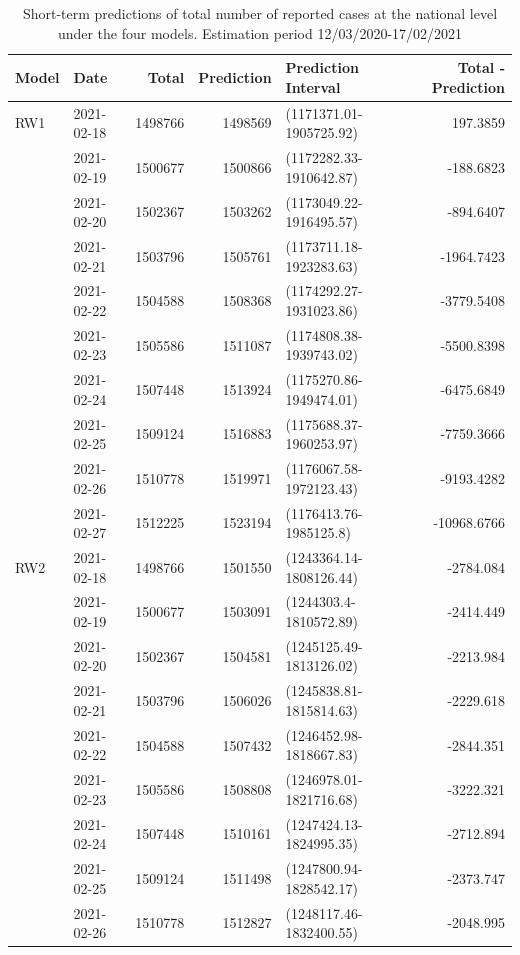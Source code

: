 \documentclass[10pt,letterpaper]{article}
\begin{document}
\begin{table}[!h]

\caption{\label{tab:10daypred}Short-term predictions of total number of reported cases at the national level under the four models. Estimation period 12/03/2020-17/02/2021}
\centering
\begin{tabular}[t]{l|l|r|r|l|r}
\hline
Model&Date & Total & Prediction & Prediction Interval & Total - Prediction\\
\hline
RW1&2021-02-18 & 1498766 & 1498569 & (1171371.01-1905725.92) & 197.3859\\
&2021-02-19 & 1500677 & 1500866 & (1172282.33-1910642.87) & -188.6823\\
&2021-02-20 & 1502367 & 1503262 & (1173049.22-1916495.57) & -894.6407\\
&2021-02-21 & 1503796 & 1505761 & (1173711.18-1923283.63) & -1964.7423\\
&2021-02-22 & 1504588 & 1508368 & (1174292.27-1931023.86) & -3779.5408\\
&2021-02-23 & 1505586 & 1511087 & (1174808.38-1939743.02) & -5500.8398\\
&2021-02-24 & 1507448 & 1513924 & (1175270.86-1949474.01) & -6475.6849\\
&2021-02-25 & 1509124 & 1516883 & (1175688.37-1960253.97) & -7759.3666\\
&2021-02-26 & 1510778 & 1519971 & (1176067.58-1972123.43) & -9193.4282\\
&2021-02-27 & 1512225 & 1523194 & (1176413.76-1985125.8) & -10968.6766\\
\hline
RW2&2021-02-18 & 1498766 & 1501550 & (1243364.14-1808126.44) & -2784.084\\
&2021-02-19 & 1500677 & 1503091 & (1244303.4-1810572.89) & -2414.449\\
&2021-02-20 & 1502367 & 1504581 & (1245125.49-1813126.02) & -2213.984\\
&2021-02-21 & 1503796 & 1506026 & (1245838.81-1815814.63) & -2229.618\\
&2021-02-22 & 1504588 & 1507432 & (1246452.98-1818667.83) & -2844.351\\
&2021-02-23 & 1505586 & 1508808 & (1246978.01-1821716.68) & -3222.321\\
&2021-02-24 & 1507448 & 1510161 & (1247424.13-1824995.35) & -2712.894\\
&2021-02-25 & 1509124 & 1511498 & (1247800.94-1828542.17) & -2373.747\\
&2021-02-26 & 1510778 & 1512827 & (1248117.46-1832400.55) & -2048.995\\

\end{tabular}
\end{table}
\end{document}
